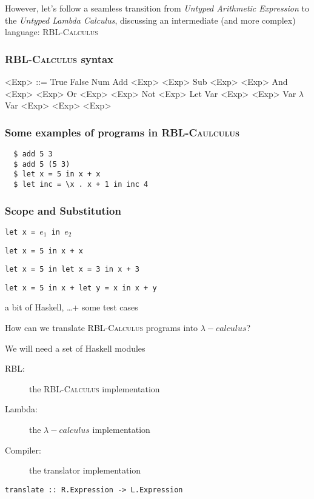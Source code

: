 \documentclass{beamer}
\begin{document}
\begin{frame}
  However, let's follow a seamless
  transition from \emph{Untyped Arithmetic Expression}
  to the \emph{Untyped Lambda Calculus}\pause, discussing
  an intermediate (and more complex) language: \textsc{RBL-Calculus} 
\end{frame}

\begin{frame}
  \frametitle{\textsc{RBL-Calculus} syntax}

\begin{grammar}
  <Exp> ::= True
  \alt False
  \alt Num
  \alt Add <Exp> <Exp> \alt Sub <Exp> <Exp> 
  \alt And <Exp> <Exp> \alt Or <Exp> <Exp> \alt Not <Exp>
  \alt Let Var <Exp> <Exp>
  \alt Var 
  \alt $\lambda$ Var  <Exp>
  \alt <Exp> <Exp> 
\end{grammar}
\end{frame}

\begin{frame}[fragile]
  \frametitle{Some examples of programs in \textsc{RBL-Caulculus}}

\begin{verbatim}
  $ add 5 3 
  $ add 5 (5 3) 
  $ let x = 5 in x + x
  $ let inc = \x . x + 1 in inc 4   
\end{verbatim} 
\end{frame}

\begin{frame}
  \frametitle{Scope and Substitution}

  \texttt{let x = $e_1$ in $e_2$} \pause
  
  \texttt{let x = 5 in x + x} \pause 

  \texttt{let x = 5 in let x = 3 in x + 3} \pause  

  \texttt{let x = 5 in x + let y = x in x + y} 

\end{frame}

\begin{frame}
\huge{a bit of Haskell, \ldots + some test cases} 
\end{frame}

\begin{frame}[fragile]
  How can we translate \textsc{RBL-Calculus} programs into
  \textsc{$\lambda-calculus$}?

  \pause

  \begin{block}{We will need a set of Haskell modules}
    \begin{description}
      \item[RBL:] the \textsc{RBL-Calculus} implementation
      \item[Lambda:] the \textsc{$\lambda-calculus$} implementation
      \item[Compiler:] the translator implementation
    \end{description}
  \end{block}

\begin{center}
\begin{verbatim}
translate :: R.Expression -> L.Expression
\end{verbatim}
\end{center}
\end{frame}
\end{document}
